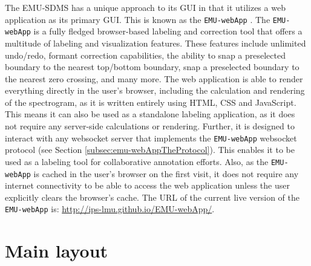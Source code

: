 \documentclass[]{book}
\begin{document}
The EMU-SDMS has a unique approach to its GUI in that it utilizes a web application as its primary GUI. This is known as the \texttt{EMU-webApp} \citep{winkelmann:2015d}. The \texttt{EMU-webApp} is a fully fledged browser-based labeling and correction tool that offers a multitude of labeling and visualization features. These features include unlimited undo/redo, formant correction capabilities, the ability to snap a preselected boundary to the nearest top/bottom boundary, snap a preselected boundary to the nearest zero crossing, and many more. The web application is able to render everything directly in the user's browser, including the calculation and rendering of the spectrogram, as it is written entirely using HTML, CSS and JavaScript. This means it can also be used as a standalone labeling application, as it does not require any server-side calculations or rendering. Further, it is designed to interact with any websocket server that implements the \texttt{EMU-webApp} websocket protocol (see Section \ref{subsec:emu-webAppTheProtocol}). This enables it to be used as a labeling tool for collaborative annotation efforts. Also, as the \texttt{EMU-webApp} is cached in the user's browser on the first visit, it does not require any internet connectivity to be able to access the web application unless the user explicitly clears the browser's cache. The URL of the current live version of the \texttt{EMU-webApp} is: \url{http://ips-lmu.github.io/EMU-webApp/}.

\hypertarget{sec:emu-webApp-mainLayout}{%
\section{Main layout}\label{sec:emu-webApp-mainLayout}}
\end{document}
